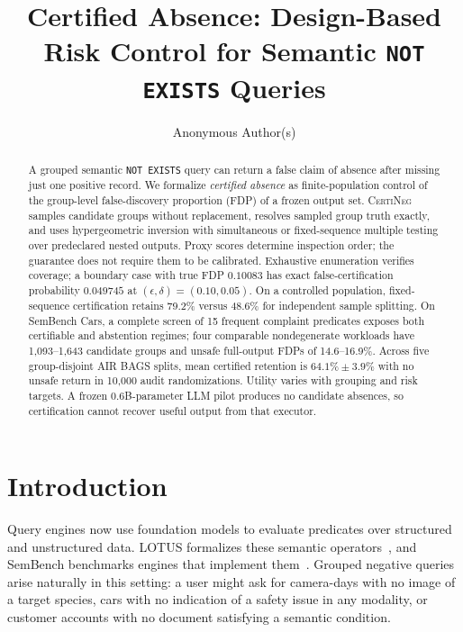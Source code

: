 \documentclass[runningheads]{llncs}
\newcommand{\CN}{\textsc{CertiNeg}\xspace}
\begin{document}
\raggedbottom
\title{Certified Absence: Design-Based Risk Control for Semantic \texttt{NOT EXISTS} Queries}
\author{Anonymous Author(s)}
\maketitle

\begin{abstract}
A grouped semantic \texttt{NOT EXISTS} query can return a false claim of absence after missing just one positive record. We formalize \emph{certified absence} as finite-population control of the group-level false-discovery proportion (FDP) of a frozen output set. \CN samples candidate groups without replacement, resolves sampled group truth exactly, and uses hypergeometric inversion with simultaneous or fixed-sequence multiple testing over predeclared nested outputs. Proxy scores determine inspection order; the guarantee does not require them to be calibrated. Exhaustive enumeration verifies coverage; a boundary case with true FDP $0.10083$ has exact false-certification probability $0.049745$ at $(\epsilon,\delta)=(0.10,0.05)$. On a controlled population, fixed-sequence certification retains 79.2\% versus 48.6\% for independent sample splitting. On SemBench Cars, a complete screen of 15 frequent complaint predicates exposes both certifiable and abstention regimes; four comparable nondegenerate workloads have 1,093--1,643 candidate groups and unsafe full-output FDPs of 14.6--16.9\%. Across five group-disjoint AIR BAGS splits, mean certified retention is $64.1\%\pm3.9\%$ with no unsafe return in 10,000 audit randomizations. Utility varies with grouping and risk targets. A frozen 0.6B-parameter LLM pilot produces no candidate absences, so certification cannot recover useful output from that executor.
\end{abstract}

\section{Introduction}
Query engines now use foundation models to evaluate predicates over structured and unstructured data. LOTUS formalizes these semantic operators~\cite{lotus2025}, and SemBench benchmarks engines that implement them~\cite{sembench2026}. Grouped negative queries arise naturally in this setting: a user might ask for camera-days with no image of a target species, cars with no indication of a safety issue in any modality, or customer accounts with no document satisfying a semantic condition.
\end{document}
